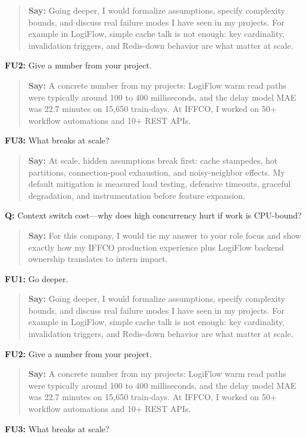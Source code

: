 \documentclass[9pt,a4paper]{article}
\begin{document}
\begin{quote}\small\textbf{Say:} Going deeper, I would formalize assumptions, specify complexity bounds, and discuss real failure modes I have seen in my projects. For example in LogiFlow, simple cache talk is not enough: key cardinality, invalidation triggers, and Redis-down behavior are what matter at scale.\end{quote}
\vspace{2mm}
\textbf{FU2:} Give a number from your project.

\begin{quote}\small\textbf{Say:} A concrete number from my projects: LogiFlow warm read paths were typically around 100 to 400 milliseconds, and the delay model MAE was 22.7 minutes on 15,650 train-days. At IFFCO, I worked on 50+ workflow automations and 10+ REST APIs.\end{quote}
\vspace{2mm}
\textbf{FU3:} What breaks at scale?

\begin{quote}\small\textbf{Say:} At scale, hidden assumptions break first: cache stampedes, hot partitions, connection-pool exhaustion, and noisy-neighbor effects. My default mitigation is measured load testing, defensive timeouts, graceful degradation, and instrumentation before feature expansion.\end{quote}
\vspace{2mm}
\textbf{Q:} Context switch cost---why does high concurrency hurt if work is CPU-bound?

\begin{quote}\small\textbf{Say:} For this company, I would tie my answer to your role focus and show exactly how my IFFCO production experience plus LogiFlow backend ownership translates to intern impact.\end{quote}
\vspace{2mm}
\textbf{FU1:} Go deeper.

\begin{quote}\small\textbf{Say:} Going deeper, I would formalize assumptions, specify complexity bounds, and discuss real failure modes I have seen in my projects. For example in LogiFlow, simple cache talk is not enough: key cardinality, invalidation triggers, and Redis-down behavior are what matter at scale.\end{quote}
\vspace{2mm}
\textbf{FU2:} Give a number from your project.

\begin{quote}\small\textbf{Say:} A concrete number from my projects: LogiFlow warm read paths were typically around 100 to 400 milliseconds, and the delay model MAE was 22.7 minutes on 15,650 train-days. At IFFCO, I worked on 50+ workflow automations and 10+ REST APIs.\end{quote}
\vspace{2mm}
\textbf{FU3:} What breaks at scale?
\end{document}
